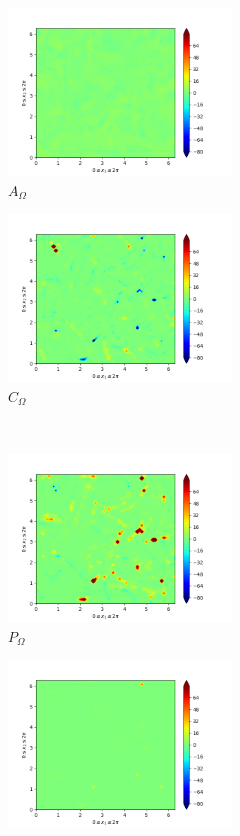 \begin{figure}[H]
\begin{subfigure}{0.45\textwidth}
        \includegraphics[height=1.75in]{media/run-cds-65/A-enst-1335.png}
        \caption{$A_{\Omega}$}
    \end{subfigure}
    \newline
    \begin{subfigure}{0.45\textwidth}
        \includegraphics[height=1.75in]{media/run-cds-65/Pi-enst-1335.png}
        \caption{$C_{\Omega}$}
    \end{subfigure}
    ~
    \begin{subfigure}{0.45\textwidth}
        \includegraphics[height=1.75in]{media/run-cds-65/P-enst-1335.png}
        \caption{$P_{\Omega}$}
    \end{subfigure}
    \newline
    \begin{subfigure}{0.45\textwidth}
        \includegraphics[height=1.75in]{media/run-cds-65/B-enst-1335.png}

\end{subfigure}
\end{figure}
